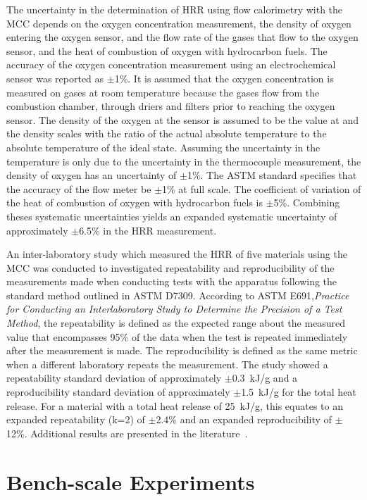 \documentclass[12pt,oneside]{book}
\begin{document}
The uncertainty in the determination of HRR using flow calorimetry with the MCC depends on the oxygen concentration measurement, the density of oxygen entering the oxygen sensor, and the flow rate of the gases that flow to the oxygen sensor, and the heat of combustion of oxygen with hydrocarbon fuels. The accuracy of the oxygen concentration measurement using an electrochemical sensor was reported as $\pm$1\%. It is assumed that the oxygen concentration is measured on gases at room temperature because the gases flow from the combustion chamber, through driers and filters prior to reaching the oxygen sensor. The density of the oxygen at the sensor is assumed to be the value at  and the density scales with the ratio of the actual absolute temperature to the absolute temperature of the ideal state. Assuming the uncertainty in the temperature is only due to the uncertainty in the thermocouple measurement, the density of oxygen has an uncertainty of $\pm$1\%. The ASTM standard specifies that the accuracy of the flow meter be $\pm$1\% at full scale. The coefficient of variation of the heat of combustion of oxygen with hydrocarbon fuels is $\pm$5\%. Combining theses systematic uncertainties yields an expanded systematic uncertainty of approximately $\pm$6.5\% in the HRR measurement.

An inter-laboratory study which measured the HRR of five materials using the MCC was conducted to investigated repeatability and reproducibility of the measurements made when conducting tests with the apparatus following the standard method outlined in ASTM D7309. According to ASTM E691,\emph{Practice for Conducting an Interlaboratory Study to Determine the Precision of a Test Method}, the repeatability is defined as the expected range about the measured value that encompasses 95\% of the data when the test is repeated immediately after the measurement is made. The reproducibility is defined as the same metric when a different laboratory repeats the measurement. The study showed a repeatability standard deviation of approximately $\pm$0.3~kJ/g and a reproducibility standard deviation of approximately $\pm$1.5~kJ/g for the total heat release. For a material with a total heat release of 25~kJ/g, this equates to an expanded repeatability (k=2) of $\pm$2.4\% and an expanded reproducibility of $\pm$12\%. Additional results are presented in the literature~\cite{ASTM_D7309,MCC_ILS}. 

\section{Bench-scale Experiments}
\label{sec:bench_scale_exp}
\end{document}
